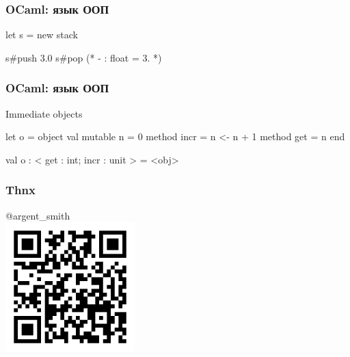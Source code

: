 \begin{frame}[fragile]
  \frametitle{OCaml: язык ООП}

  \begin{ocamlcode}
let s = new stack

s#push 3.0
s#pop         (* - : float = 3. *)
  \end{ocamlcode}
  \vfill
\end{frame}

\begin{frame}[fragile]
  \frametitle{OCaml: язык ООП}

  \large Immediate objects
  \small
  \begin{ocamlcode}
let o =
  object
    val mutable n = 0
    method incr = n <- n + 1
    method get = n
  end

val o : < get : int; incr : unit > = <obj>
  \end{ocamlcode}
  \vfill
\end{frame}

\begin{frame}
  \frametitle{Thnx}

  \begin{center}
    \LARGE @argent\_smith\\
    \vspace{3mm}
    \includegraphics[width=5cm,keepaspectratio]{./images/qr-lecture.png}\\
  \end{center}
\end{frame}


